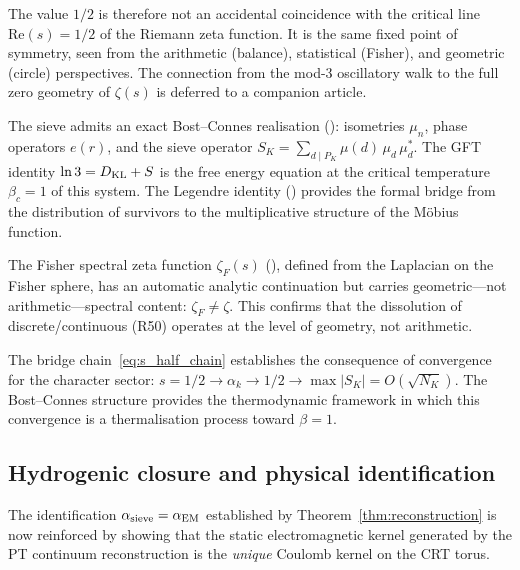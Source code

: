\documentclass[12pt,a4paper]{article}
\begin{document}
\medskip\noindent
The value $1/2$ is therefore not an accidental coincidence with the
critical line $\mathrm{Re}(s) = 1/2$ of the Riemann zeta function.
It is the same fixed point of symmetry, seen from the arithmetic
(balance), statistical (Fisher), and geometric (circle) perspectives.
The connection from the mod-3 oscillatory walk to the full zero
geometry of $\zeta(s)$ is deferred to a companion article.

\begin{remark}\mBR
\label{rem:bc_bridge}
The sieve admits an exact Bost--Connes realisation
(\cite{companion_M4}): isometries $\mu_n$, phase
operators $e(r)$, and the sieve operator
$S_K = \sum_{d \mid P_K} \mu(d)\,\mu_d\,\mu_d^*$.
The GFT identity $\ln 3 = D_{\rm KL} + S$ is the free energy
equation at the critical temperature $\beta_c = 1$ of this system.
The Legendre identity (\cite{companion_M4}) provides
the formal bridge from the distribution of survivors to the
multiplicative structure of the M\"obius function.

The Fisher spectral zeta function
$\zeta_F(s)$ (\cite{companion_M4}), defined from the
Laplacian on the Fisher sphere, has an automatic analytic
continuation but carries geometric---not arithmetic---spectral
content: $\zeta_F \neq \zeta$.  This confirms that the dissolution
of discrete/continuous (R50) operates at the level of geometry, not
arithmetic.

The bridge chain~\eqref{eq:s_half_chain} establishes the
consequence of convergence for the character sector: $s = 1/2
\to \alpha_k \to 1/2 \to \max|S_K| = O(\sqrt{N_K})$.
The Bost--Connes structure provides the thermodynamic framework
in which this convergence is a thermalisation process toward
$\beta = 1$.
\end{remark}

\subsection{Hydrogenic closure and physical identification}
\label{sec:ch9_hydrogenic}

The identification $\alpha_{\rm sieve} = \alpha_{\rm EM}$ established
by Theorem~\ref{thm:reconstruction} is now reinforced by showing that
the static electromagnetic kernel generated by the PT continuum
reconstruction is the \emph{unique} Coulomb kernel on the CRT torus.
\end{document}
